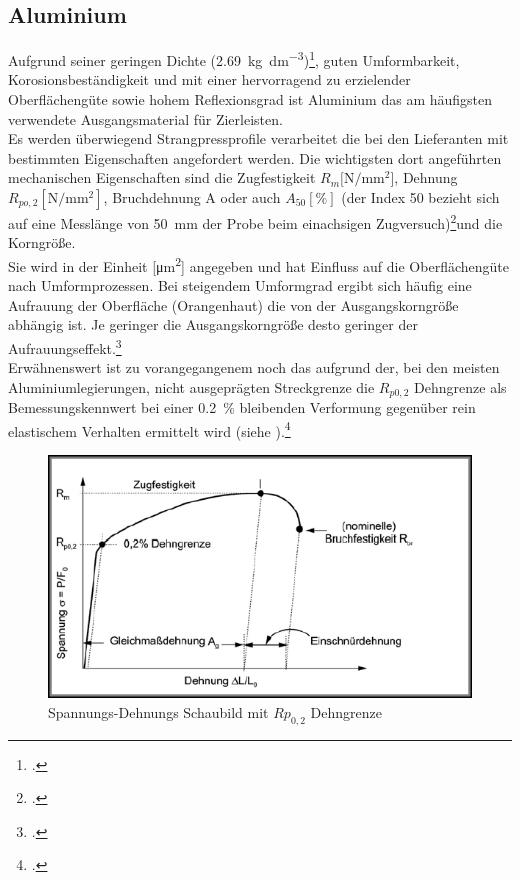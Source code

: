 \documentclass[12pt,a4paper,parskip]{scrartcl}
\begin{document}
\subsection{Aluminium}
Aufgrund seiner geringen Dichte (\SI{2.69}{\kilo\gram\per\deci\meter\cubed})\footcite[Vgl.][353]{wm}, guten Umformbarkeit, Korosionsbeständigkeit und mit einer hervorragend zu erzielender Oberflächengüte sowie hohem Reflexionsgrad ist Aluminium das am häufigsten verwendete Ausgangsmaterial für Zierleisten.\\
 Es werden überwiegend Strangpressprofile verarbeitet die bei den Lieferanten mit bestimmten Eigenschaften angefordert werden. Die wichtigsten dort angeführten mechanischen Eigenschaften sind die Zugfestigkeit $R_m  [\si{\newton\per\milli\meter\squared}$], Dehnung $R_{po,2} [\si{\newton\per\milli\meter\squared}]$,   Bruchdehnung A oder auch $A_{50} [\si{\percent}]$ (der Index 50 bezieht sich auf eine Messlänge  von \SI{50}{\milli\meter} der Probe  beim einachsigen Zugversuch)\footcite[Vgl.][281]{aa}und die Korngröße.\\
  Sie wird in der Einheit [\si{\micro\meter\squared}] angegeben und hat Einfluss auf die Oberflächengüte nach  Umformprozessen. Bei steigendem Umformgrad ergibt sich häufig eine Aufrauung der Oberfläche (Orangenhaut) die von der Ausgangskorngröße abhängig ist. Je geringer die Ausgangskorngröße desto geringer der Aufrauungseffekt.\footcite[Vgl.][524]{aa}\\
Erwähnenswert ist zu vorangegangenem noch das aufgrund der, bei den meisten Aluminiumlegierungen, nicht ausgeprägten Streckgrenze  die $R_{p0,2}$ Dehngrenze als Bemessungskennwert bei einer \SI{0.2}{\percent} bleibenden Verformung gegenüber rein elastischem Verhalten ermittelt wird (siehe ).\footcite[Vgl.][280-281]{aa}  
\begin{figure}[h!tbp]
\centering
 	\includegraphics[scale=.9]{spanndehn2}
 	\caption{Spannungs-Dehnungs Schaubild mit $Rp_{0,2} $ Dehngrenze}
 	\label{fig:spanndehn2}
 	\end{figure}
	 	 	 	 
\end{document}
